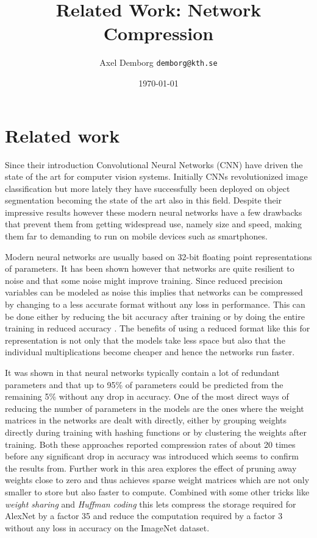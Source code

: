 \documentclass[11pt]{article}
\author{Axel Demborg \texttt{demborg@kth.se}}
\date{\today}
\title{Related Work: Network Compression}
\newcommand{\bibentry}[1]{\cite{#1}}
\begin{document}
\maketitle

\section*{Related work}
\label{sec:org44864ae}
Since their introduction Convolutional Neural Networks (CNN)\bibentry{lecun1998gradient} have driven the state of the art for computer vision systems. Initially CNNs revolutionized image classification\bibentry{krizhevsky2012imagenet} but more lately they have successfully been deployed on object segmentation\bibentry{girshick2015fast} \bibentry{ren2015faster} \bibentry{badrinarayanan2015segnet} \bibentry{he2017mask} becoming the state of the art also in this field. Despite their impressive results however these modern neural networks have a few drawbacks that prevent them from getting widespread use, namely size and speed, making them far to demanding to run on mobile devices such as smartphones\bibentry{han2015learning}.

Modern neural networks are usually based on 32-bit floating point representations of parameters. It has been shown however that networks are quite resilient to noise and that some noise might improve training\bibentry{murray1994enhanced}. Since reduced precision variables can be modeled as noise this implies that networks can be compressed by changing to a less accurate format without any loss in performance. This can be done either by reducing the bit accuracy after training\bibentry{vanhoucke2011improving}  or by doing the entire training in reduced accuracy\bibentry{hubara2016quantized} \bibentry{gupta2015deep}. The benefits of using a reduced format like this for representation is not only that the models take less space but also that the individual multiplications become cheaper and hence the networks run faster.

It was shown in\bibentry{denil2013predicting} that neural networks typically contain a lot of redundant parameters and that up to 95\% of parameters could be predicted from the remaining 5\% without any drop in accuracy. One of the most direct ways of reducing the number of parameters in the models are the ones where the weight matrices in the networks are dealt with directly, either by grouping weights directly during training with hashing functions \bibentry{chen2015compressing} or by clustering the weights after training\bibentry{gong2014compressing}. Both these approaches reported compression rates of about 20 times before any significant drop in accuracy was introduced which seems to confirm the results from\bibentry{denil2013predicting}. Further work in this area \bibentry{han2015learning} explores the effect of pruning away weights close to zero and thus achieves sparse weight matrices which are not only smaller to store but also faster to compute. Combined with some other tricks like \emph{weight sharing} and \emph{Huffman coding} this lets\bibentry{han2015deep} compress the storage required for AlexNet by a factor 35 and reduce the computation required by a factor 3 without any loss in accuracy on the ImageNet dataset.
\end{document}

